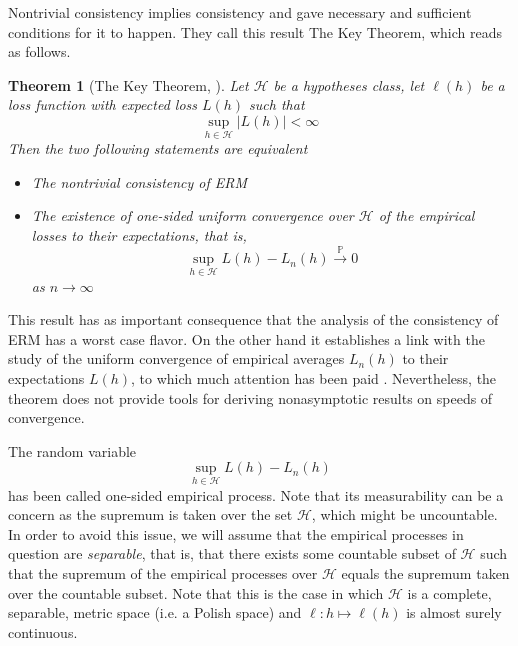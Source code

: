 \documentclass{uvamath}
\newcommand*{\calH}{\mathcal{H}}
\newcommand*{\bbP}{\mathbb{P}}
\newcommand*{\toinP}{\overset{\bbP}{\longrightarrow}}
\newtheorem{theorem}{Theorem}[section]
\theoremstyle{remark}
\theoremstyle{definition}
\theoremstyle{definition}
\theoremstyle{definition}
\theoremstyle{definition}
\theoremstyle{definition}
\begin{document}
Nontrivial consistency implies consistency and
\citet{vapnik_necessary_1991} gave necessary and sufficient conditions
for it to happen. They call this result The Key Theorem, which
reads as follows.

\begin{theorem}[The Key Theorem, \citet{vapnik_necessary_1991}]
\label{thm:key_theorem}
Let $\calH$ be a hypotheses class, let $\ell(h)$ be a loss function
with expected loss $L(h)$ such that
\begin{equation*}
  \sup_{h\in\calH}|L(h)|<\infty
\end{equation*}
Then the two following statements are equivalent
\begin{itemize}
\item The nontrivial consistency of ERM
\item The existence of one-sided uniform convergence over $\calH$ of
  the empirical losses to their expectations, that is,
  \begin{equation*}
    \sup_{h\in\calH}L(h) - L_n(h) \toinP 0
  \end{equation*}
  as $n\to\infty$
\end{itemize}
\end{theorem}

This result has as important consequence that the analysis of the
consistency of ERM has a worst case flavor. On the other hand it
establishes a link with the study of the uniform convergence of
empirical averages $L_n(h)$ to their expectations $L(h)$, to which
much attention has been paid
\citep[see][]{van_der_vaart_weak_1996}. Nevertheless, the theorem does not
provide tools for deriving nonasymptotic results on speeds of
convergence.

The random variable
\begin{equation*}
  \sup_{h\in\calH}L(h) - L_n(h)
\end{equation*}
has been called one-sided empirical process. Note that its
measurability can be a concern as the supremum is taken over the set
$\calH$, which might be uncountable. In order to avoid this issue, we
will assume that the empirical processes in question are
\textit{separable}, that is, that there exists some countable subset
of $\calH$ such that the supremum of the empirical processes over
$\calH$ equals the supremum taken over the countable subset. Note that
this is the case in which $\calH$ is a complete, separable, metric
space (i.e. a Polish space) and $\ell:h\mapsto\ell(h)$ is almost
surely continuous.

\end{document}
